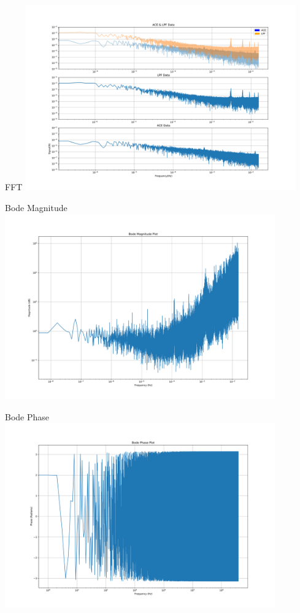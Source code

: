 \documentclass[aspectratio=169,xcolor=dvipsnames]{beamer}
\begin{document}
\begin{frame}{FFT}
    \centering
    \includegraphics[height=8cm]{ACE_and_LPF_Loglog-1.png}
\end{frame}
\begin{frame}{Bode Magnitude}
    \centering
    \includegraphics[height=8cm]{Bode_Magnitude_Plot-1.png}
\end{frame}
\begin{frame}{Bode Phase}
    \centering
    \includegraphics[height=8cm]{Bode_Phase_Plot-1.png}
\end{frame}
\end{document}
